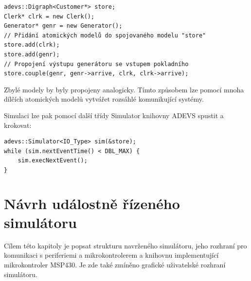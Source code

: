 \begin{lstlisting}
adevs::Digraph<Customer*> store;
Clerk* clrk = new Clerk();
Generator* genr = new Generator();
// Přidání atomických modelů do spojovaného modelu "store"
store.add(clrk); 
store.add(genr);
// Propojení výstupu generátoru se vstupem pokladního
store.couple(genr, genr->arrive, clrk, clrk->arrive);
\end{lstlisting}

Zbylé modely by byly propojeny analogicky. Tímto způsobem lze pomocí mnoha dílčích atomických modelů vytvářet rozsáhlé komunikující systémy.

Simulaci lze pak pomocí další třídy Simulator knihovny ADEVS spustit a krokovat:

\begin{lstlisting}
adevs::Simulator<IO_Type> sim(&store);
while (sim.nextEventTime() < DBL_MAX) {
    sim.execNextEvent();
}
\end{lstlisting}

\chapter{Návrh událostně řízeného simulátoru}
\label{navrh}

Cílem této kapitoly je popsat strukturu navrženého simulátoru, jeho rozhraní pro komunikaci s periferiemi a mikrokontrolerem a knihovnu implementující mikrokontroler MSP430. Je zde také zmíněno grafické uživatelské rozhraní simulátoru.

